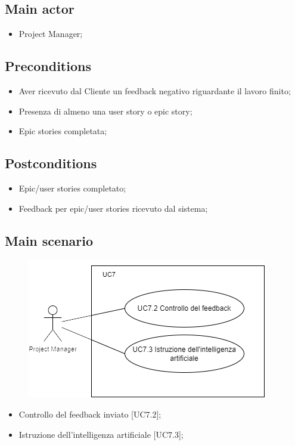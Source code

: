 \documentclass{article}
\begin{document}
    \subsection*{Main actor}
    \begin{itemize}
        \item Project Manager;
    \end{itemize}
    
    \subsection*{Preconditions}
    \begin{itemize}
        \item Aver ricevuto dal Cliente un feedback negativo riguardante il lavoro finito;
        \item Presenza di almeno una user story o epic story;
        \item Epic stories completata;
    \end{itemize}
    
    \subsection*{Postconditions}
    \begin{itemize}
        \item Epic/user stories completato;
        \item Feedback per epic/user stories ricevuto dal sistema; 
    \end{itemize}
    
    \subsection*{Main scenario}
        \begin{figure}[h]
            \centering
            \includegraphics{documenti/imgUML/UC7-zoom.png}
            \label{fig:immagine}
        \end{figure}
        \begin{itemize}
            \item Controllo del feedback inviato [UC7.2];
            \item Istruzione dell'intelligenza artificiale [UC7.3];
        \end{itemize}
        
\end{document}
